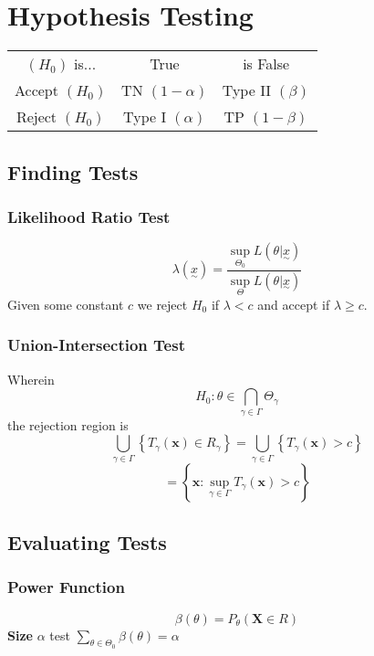 \section{Hypothesis Testing}
	\begin{tabular}{ccc}
		\((H_0)\) is... &  True & is False \\
		Accept \((H_0)\) & TN \((1-\alpha)\) & Type II \((\beta)\) \\
		Reject \((H_0)\) & Type I \((\alpha)\) & TP \((1-\beta)\)
	\end{tabular}

	\subsection{Finding Tests}
		\subsubsection{Likelihood Ratio Test}
			\[ \lambda(\underset{\sim}{x}) = \frac{\sup_{\Theta_0}L(\theta|\underset{\sim}{x})}{\sup_{\Theta}L(\theta|\underset{\sim}{x})}\]
			Given some constant \(c\) we reject \(H_0\) if \(\lambda<c\) and accept if \(\lambda\geq c\).
			
		\subsubsection{Union-Intersection Test}
			Wherein 
			\[H_0:\theta\in\bigcap_{\gamma\in\Gamma}\Theta_\gamma\]
			the rejection region is
			\[\bigcup_{\gamma\in\Gamma} \left\{T_\gamma(\mathbf{x})\in R_\gamma\right\}
			= \bigcup_{\gamma\in\Gamma} \left\{T_\gamma(\mathbf{x}) > c\right\} \]
			\[= \left\{\mathbf{x}:\underset{\gamma\in\Gamma}{\sup}T_\gamma(\mathbf{x})>c\right\} \]
		
		
		
	\subsection{Evaluating Tests}
		\subsubsection{Power Function}
			\[\beta(\theta) = P_\theta(\mathbf{X}\in R)\]
		\textbf{Size} \(\alpha\) test \(\sum_{\theta\in\Theta_0} \beta(\theta) = \alpha\)
		
